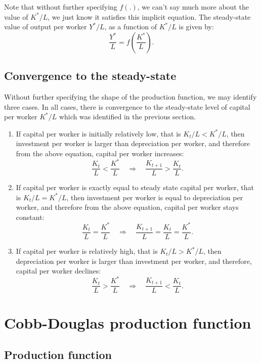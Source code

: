 \documentclass[]{book}
\theoremstyle{definition}
\theoremstyle{definition}
\theoremstyle{definition}
\theoremstyle{remark}
\begin{document}
Note that without further specifying \(f(.)\), we can't say much more
about the value of \(K^{*}/L\), we just know it satisfies this implicit
equation. The steady-state value of output per worker \(Y^{*}/L\), as a
function of \(K^{*}/L\) is given by:
\[\frac{Y^{*}}{L}=f\left(\frac{K^{*}}{L}\right).\]

\subsection{Convergence to the
steady-state}\label{convergence-to-the-steady-state}

Without further specifying the shape of the production function, we may
identify three cases. In all cases, there is convergence to the
steady-state level of capital per worker \(K^{*}/L\) which was
identified in the previous section.

\begin{enumerate}
\def\labelenumi{\arabic{enumi}.}
\item
  If capital per worker is initially relatively low, that is
  \(K_{t}/L<K^{*}/L\), then investment per worker is larger than
  depreciation per worker, and therefore from the above equation,
  capital per worker increases:
  \[\boxed{\frac{K_t}{L}<\frac{K^{*}}{L} \quad \Rightarrow \quad \frac{K_{t+1}}{L}>\frac{K_{t}}{L}}.\]
\item
  If capital per worker is exactly equal to steady state capital per
  worker, that is \(K_{t}/L=K^{*}/L\), then investment per worker is
  equal to depreciation per worker, and therefore from the above
  equation, capital per worker stays constant:
  \[\boxed{\frac{K_t}{L}=\frac{K^{*}}{L} \quad \Rightarrow \quad \frac{K_{t+1}}{L}=\frac{K_{t}}{L}=\frac{K^{*}}{L}}.\]
\item
  If capital per worker is relatively high, that is \(K_{t}/L>K^{*}/L\),
  then depreciation per worker is larger than investment per worker, and
  therefore, capital per worker declines:
  \[\boxed{\frac{K_t}{L}>\frac{K^{*}}{L} \quad \Rightarrow \quad \frac{K_{t+1}}{L}<\frac{K_{t}}{L}}.\]
\end{enumerate}

\section{Cobb-Douglas production function}\label{cobb}

\subsection{Production function}\label{production-function}
\end{document}

